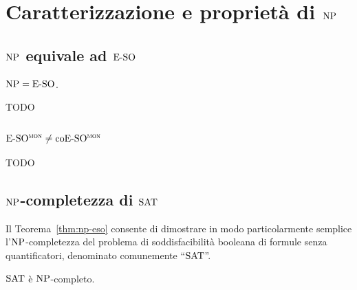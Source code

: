 \chapter{Caratterizzazione e proprietà di $\operatorname{NP}$}

\section{$\operatorname{NP}$ equivale ad $\operatorname{E-SO}$}

\begin{teorema}[Fagin]
  \label{thm:np-eso}
  $\operatorname{NP} = \operatorname{E-SO}$.
\end{teorema}


TODO


\section{$\operatorname{E-SO^{\normalfont\textsc{mon}}} \neq \operatorname{coE-SO^{\normalfont\textsc{mon}}}$}

TODO


\section{$\operatorname{NP}$-completezza di $\operatorname{SAT}$}

Il Teorema~\ref{thm:np-eso} consente di dimostrare in modo particolarmente semplice l'$\operatorname{NP}$-com\-ple\-tez\-za del problema di soddisfacibilità booleana di formule senza quantificatori, denominato comunemente ``$\operatorname{SAT}$''.

\begin{teorema}
  $\operatorname{SAT}$ è $\operatorname{NP}$-completo.
\end{teorema}

